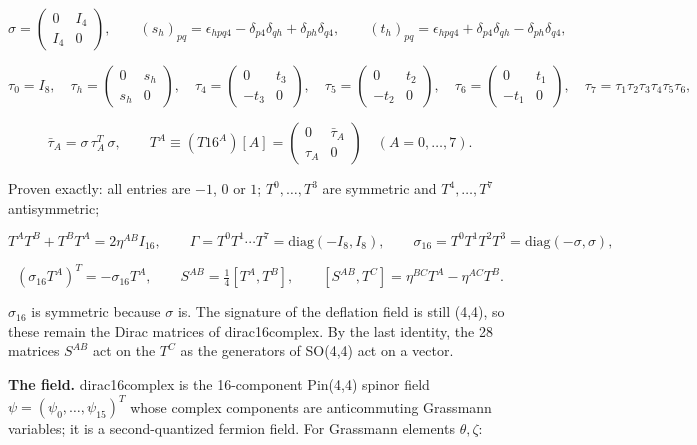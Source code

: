 \documentclass[10pt]{article}
\makeatletter
\newcommand\keepnext{\par\nopagebreak\@nobreaktrue\everypar{\@nobreakfalse\everypar{}}}
\makeatother
\begin{document}
\[
\sigma = \begin{pmatrix} 0 & I_4 \\ I_4 & 0 \end{pmatrix}, \qquad (s_h)_{pq} = \epsilon_{hpq4} - \delta_{p4}\delta_{qh} + \delta_{ph}\delta_{q4}, \qquad (t_h)_{pq} = \epsilon_{hpq4} + \delta_{p4}\delta_{qh} - \delta_{ph}\delta_{q4},
\]

\[
\tau_0 = I_8, \quad \tau_h = \begin{pmatrix} 0 & s_h \\ s_h & 0 \end{pmatrix}, \quad \tau_4 = \begin{pmatrix} 0 & t_3 \\ -t_3 & 0 \end{pmatrix}, \quad \tau_5 = \begin{pmatrix} 0 & t_2 \\ -t_2 & 0 \end{pmatrix}, \quad \tau_6 = \begin{pmatrix} 0 & t_1 \\ -t_1 & 0 \end{pmatrix}, \quad \tau_7 = \tau_1\tau_2\tau_3\tau_4\tau_5\tau_6 ,
\]

\[
\bar\tau_A = \sigma\,\tau_A^T\,\sigma, \qquad T^A \equiv (T16^A)[A] = \begin{pmatrix} 0 & \bar\tau_A \\ \tau_A & 0 \end{pmatrix} \quad (A = 0, \dots, 7).
\]

Proven exactly: all entries are $-1$, $0$ or $1$; $T^0, \dots, T^3$ are symmetric and $T^4, \dots, T^7$ antisymmetric;\keepnext


\[
T^AT^B + T^BT^A = 2\eta^{AB}I_{16}, \qquad \Gamma = T^0T^1\cdots T^7 = \mathrm{diag}(-I_8, I_8), \qquad \sigma_{16} = T^0T^1T^2T^3 = \mathrm{diag}(-\sigma, \sigma),
\]

\[
(\sigma_{16}T^A)^T = -\sigma_{16}T^A, \qquad S^{AB} = \tfrac14[T^A, T^B], \qquad [S^{AB}, T^C] = \eta^{BC}T^A - \eta^{AC}T^B .
\]

$\sigma_{16}$ is symmetric because $\sigma$ is. The signature of the deflation field is still (4,4), so these remain the Dirac matrices of dirac16complex. By the last identity, the 28 matrices $S^{AB}$ act on the $T^C$ as the generators of SO(4,4) act on a vector.


\textbf{The field.} dirac16complex is the 16-component Pin(4,4) spinor field $\psi = (\psi_0, \dots, \psi_{15})^T$ whose complex components are anticommuting Grassmann variables; it is a second-quantized fermion field. For Grassmann elements $\theta, \zeta$:\keepnext
\end{document}
